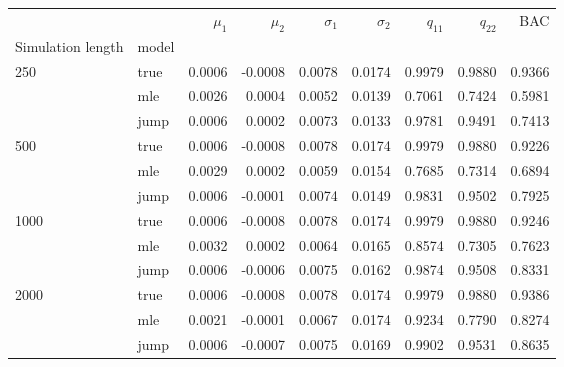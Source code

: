 \begin{tabular}{llrrrrrrr}
\toprule
     &      &  $\mu_1$ &  $\mu_2$ &  $\sigma_1$ &  $\sigma_2$ &  $q_{11}$ &  $q_{22}$ &     BAC \\
Simulation length & model &          &          &             &             &           &           &         \\
\midrule
250  & true &   0.0006 &  -0.0008 &      0.0078 &      0.0174 &    0.9979 &    0.9880 &  0.9366 \\
     & mle &   0.0026 &   0.0004 &      0.0052 &      0.0139 &    0.7061 &    0.7424 &  0.5981 \\
     & jump &   0.0006 &   0.0002 &      0.0073 &      0.0133 &    0.9781 &    0.9491 &  0.7413 \\
500  & true &   0.0006 &  -0.0008 &      0.0078 &      0.0174 &    0.9979 &    0.9880 &  0.9226 \\
     & mle &   0.0029 &   0.0002 &      0.0059 &      0.0154 &    0.7685 &    0.7314 &  0.6894 \\
     & jump &   0.0006 &  -0.0001 &      0.0074 &      0.0149 &    0.9831 &    0.9502 &  0.7925 \\
1000 & true &   0.0006 &  -0.0008 &      0.0078 &      0.0174 &    0.9979 &    0.9880 &  0.9246 \\
     & mle &   0.0032 &   0.0002 &      0.0064 &      0.0165 &    0.8574 &    0.7305 &  0.7623 \\
     & jump &   0.0006 &  -0.0006 &      0.0075 &      0.0162 &    0.9874 &    0.9508 &  0.8331 \\
2000 & true &   0.0006 &  -0.0008 &      0.0078 &      0.0174 &    0.9979 &    0.9880 &  0.9386 \\
     & mle &   0.0021 &  -0.0001 &      0.0067 &      0.0174 &    0.9234 &    0.7790 &  0.8274 \\
     & jump &   0.0006 &  -0.0007 &      0.0075 &      0.0169 &    0.9902 &    0.9531 &  0.8635 \\
\bottomrule
\end{tabular}
